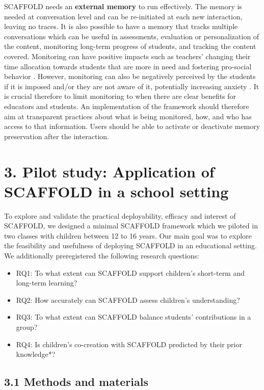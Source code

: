 \documentclass[fleqn,10pt]{wlscirep}
\begin{document}
SCAFFOLD needs an \textbf{external memory} to run effectively. The memory is needed at conversation level and can be re-initiated at each new interaction, leaving no traces. It is also possible to have a memory that tracks multiple conversations which can be useful in assessments, evaluation or personalization of the content, monitoring long-term progress of students, and tracking the content covered. Monitoring can have positive impacts such as teachers' changing their time allocation towards students that are more in need \cite{Holstein2018} and fostering pro-social behavior \cite{Canigueral2019}. However, monitoring can also be negatively perceived by the students if it is imposed and/or they are not aware of it, potentially increasing anxiety \cite{Canigueral2019}. It is crucial therefore to limit monitoring to when there are clear benefits for educators and students. An implementation of the framework should therefore aim at transparent practices about what is being monitored, how, and who has access to that information. Users should be able to activate or deactivate memory preservation after the interaction.

\section*{3. Pilot study: Application of SCAFFOLD in a school setting}

To explore and validate the practical deployability, efficacy and interest of SCAFFOLD, we designed a minimal SCAFFOLD framework which we piloted in two classes with children between 12 to 16 years. Our main goal was to explore the feasibility and usefulness of deploying SCAFFOLD in an educational setting. We additionally preregistered the following research questions:

\begin{itemize}
\item RQ1: To what extent can SCAFFOLD support children's short-term and long-term learning?
\item RQ2: How accurately can SCAFFOLD assess children's understanding?
\item RQ3: To what extent can SCAFFOLD balance students' contributions in a group?
\item RQ4: Is children's co-creation with SCAFFOLD predicted by their prior knowledge*?
\end{itemize}

\subsection*{3.1 Methods and materials}
\end{document}
